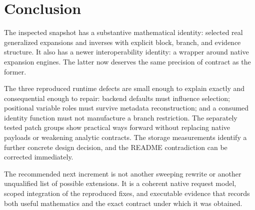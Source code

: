 \documentclass[11pt]{article}
\begin{document}
\section{Conclusion}
The inspected snapshot has a substantive mathematical identity: selected real generalized expansions and inverses with explicit block, branch, and evidence structure. It also has a newer interoperability identity: a wrapper around native expansion engines. The latter now deserves the same precision of contract as the former.

The three reproduced runtime defects are small enough to explain exactly and consequential enough to repair: backend defaults must influence selection; positional variable roles must survive metadata reconstruction; and a consumed identity function must not manufacture a branch restriction. The separately tested patch groups show practical ways forward without replacing native payloads or weakening analytic contracts. The storage measurements identify a further concrete design decision, and the README contradiction can be corrected immediately.

The recommended next increment is not another sweeping rewrite or another unqualified list of possible extensions. It is a coherent native request model, scoped integration of the reproduced fixes, and executable evidence that records both useful mathematics and the exact contract under which it was obtained.

\appendix
\end{document}
